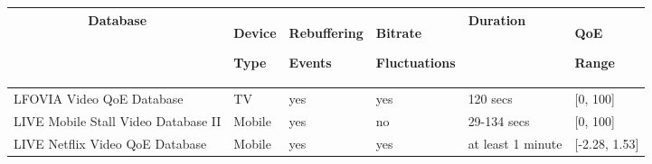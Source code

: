 \begin{tabular}{|p{4cm}|p{1.5cm}|p{2cm}|p{2cm}|p{1.5cm}|p{1.5cm}|}
\hline
\multicolumn{1}{|c|}{Database}    & Device \par Type & Rebuffering \par Events & Bitrate \par Fluctuations & Duration & QoE \par Range \\ \hline
LFOVIA Video QoE Database                  & TV                   & yes                  & yes                       & 120 secs       & {[}0, 100{]}       \\ \hline
LIVE Mobile Stall Video Database II        & Mobile               & yes                  & no                        & 29-134 secs       & {[}0, 100{]}       \\ \hline
LIVE Netflix Video QoE Database            & Mobile               & yes                  & yes                       & at least 1 minute & {[}-2.28, 1.53{]}  \\ \hline
\end{tabular}
